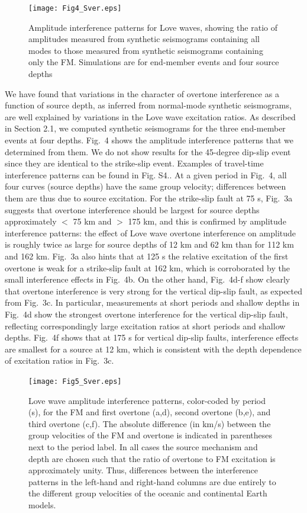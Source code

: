 \documentclass[extra,mreferee]{gji}
\begin{document}
\begin{figure}
\texttt{[image: Fig4\_Sver.eps]}
\caption{Amplitude interference patterns for Love waves, showing the ratio of amplitudes measured from synthetic seismograms containing all modes to those measured from synthetic seismograms containing only the FM. Simulations are for end-member events and four source depths}
\end{figure}
 
We have found that variations in the character of overtone interference as a function of source depth, as inferred from normal-mode synthetic seismograms, are well explained by variations in the Love wave excitation ratios. As described in Section 2.1, we computed synthetic seismograms for the three end-member events at four depths. Fig.\ 4 shows the amplitude interference patterns that we determined from them. We do not show results for the 45-degree dip-slip event since they are identical to the strike-slip event. Examples of travel-time interference patterns can be found in Fig. S4.. At a given period in Fig.\ 4, all four curves (source depths) have the same group velocity; differences between them are thus due to source excitation. For the strike-slip fault at 75 s, Fig.\ 3a suggests that overtone interference should be largest for source depths approximately $<$ 75 km and $>$ 175 km, and this is confirmed by amplitude interference patterns: the effect of Love wave overtone interference on amplitude is roughly twice as large for source depths of 12 km and 62 km than for 112 km and 162 km. Fig.\ 3a also hints that at 125 s the relative excitation of the first overtone is weak for a strike-slip fault at 162 km, which is corroborated by the small interference effects in Fig.\ 4b. On the other hand, Fig.\ 4d-f show clearly that overtone interference is very strong for the vertical dip-slip fault, as expected from Fig.\ 3c. In particular, measurements at short periods and shallow depths in Fig.\ 4d show the strongest overtone interference for the vertical dip-slip fault, reflecting correspondingly large excitation ratios at short periods and shallow depths. Fig.\ 4f shows that at 175 s for vertical dip-slip faults, interference effects are smallest for a source at 12 km, which is consistent with the depth dependence of excitation ratios in Fig.\ 3c. 

 \begin{figure}
 \texttt{[image: Fig5\_Sver.eps]}
 \caption{Love wave amplitude interference patterns, color-coded by period (s), for the FM and first overtone (a,d), second overtone (b,e), and third overtone (c,f). The absolute difference (in km/s) between the group velocities of the FM and overtone is indicated in parentheses next to the period label. In all cases the source mechanism and depth are chosen such that the ratio of overtone to FM excitation is approximately unity. Thus, differences between the interference patterns in the left-hand and right-hand columns are due entirely to the different group velocities of the oceanic and continental Earth models. }
 \end{figure}
 
\end{document}
